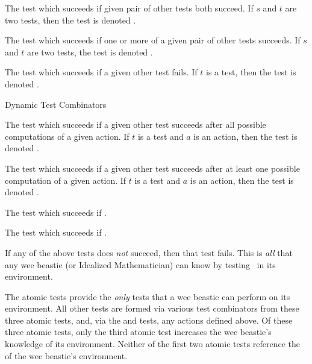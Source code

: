 \startitemize[n]

\item The test which succeeds if given pair of other tests both succeed. 
If $s$ and $t$ are two tests, then the  test is denoted 
.

\item The test which succeeds if one or more of a given pair of other 
tests succeeds. If $s$ and $t$ are two tests, the  test 
is denoted .

\item The test which succeeds if a given other test fails. If $t$ is a 
test, then the  test is denoted . 

\stopitemize

\item Dynamic Test Combinators

\startitemize[n]

\item The test which succeeds if a given other test succeeds after all 
possible computations of a given action. If $t$ is a test and $a$ is an 
action, then the  test is denoted . 

\item The test which succeeds if a given other test succeeds after at 
least one possible computation of a given action. If $t$ is a test and $a$ 
is an action, then the  test is denoted 
. 

\item The test which succeeds if .

\item The test which succeeds if . 

\stopitemize

\stopitemize

If any of the above tests does \emph{not} succeed, then that test fails. 
This is \emph{all} that any wee beastie (or Idealized Mathematician) can 
know by testing \lols\ in its environment. 

\stopDefinition

\startMMundi

The atomic tests provide the \emph{only} tests that a wee beastie can 
perform \emph{} on its environment. All other tests are 
formed via various test combinators from these three atomic tests, and, 
via the  and  tests, any actions 
defined above. Of these three atomic tests, only the third atomic test 
increases the wee beastie's knowledge of its environment. Neither of the 
first two atomic tests reference the  of the wee beastie's 
environment. 

